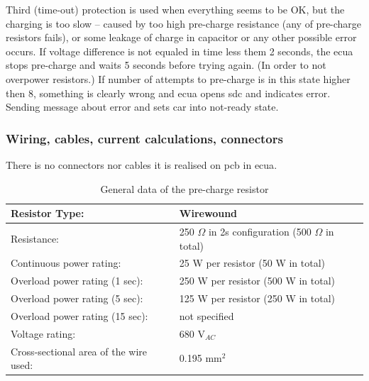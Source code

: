 Third (time-out) protection is used when everything seems to be OK, but the charging is too slow – caused by too high pre-charge resistance (any of pre-charge resistors fails), or some leakage of charge in capacitor or any other possible error occurs. If voltage difference is not equaled in time less them 2 seconds, the \gls{ecua} stops pre-charge and waits 5 seconds before trying again. (In order to not overpower resistors.) If number of attempts to pre-charge is in this state higher then 8, something is clearly wrong and \gls{ecua} opens \gls{sdc} and indicates error. Sending message about error and sets car into not-ready state.

\subsubsection{Wiring, cables, current calculations, connectors}

There is no connectors nor cables it is realised on \gls{pcb} in \gls{ecua}. 


\begin{table}[H]
	\centering
	\caption{General data of the pre-charge resistor}
	\begin{tabu}{|X|X|}
		\hline
		Resistor Type: & Wirewound \\
		\hline

		Resistance: & 250 $\Omega$ in 2s configuration (500 $\Omega$ in total) \\
		\hline
		Continuous power rating: & 25 W per resistor (50 W  in total)\\
		\hline
		Overload power rating (1 sec): & 250 W per resistor (500 W in total) \\
		\hline
		Overload power rating (5 sec): & 125 W per resistor (250 W in total) \\
		\hline
		Overload power rating (15 sec): & not specified \\
		\hline
		Voltage rating: & 680 V$_{AC}$\\
		\hline
		Cross-sectional area of the wire used: & 0.195 mm$^2$\\
		\hline
	\end{tabu}%
	\label{tab:precharge-general}%
\end{table}%

